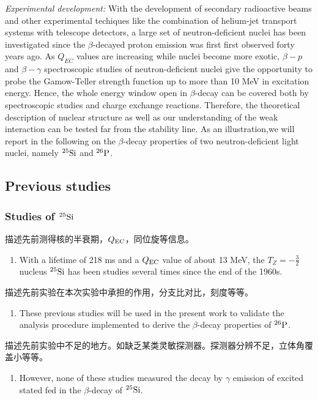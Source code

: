 \documentclass[a4paper]{article}
\begin{document}
\textit{Experimental development:} With the development of secondary radioactive beams and other experimental techiques like the combination of helium-jet transport systems with telescope detectors, a large set of neutron-deficient nuclei has been investigated since the $\beta$-decayed proton emission was first first observed forty years ago. As $Q_{EC}$ values are increasing while nuclei become more exotic, $\beta-p$ and $\beta-\gamma$ spectroscopic studies of neutron-deficient nuclei give the opportunity to probe the Gamow-Teller strength function up to more than 10 MeV in excitation energy. Hence, the whole energy window open in $\beta$-decay can be covered both by spectroscopic studies and charge exchange reactions. Therefore, the theoretical description of nuclear structure as well as our understanding of the weak interaction can be tested far from the stability line. As an illustration,we will report in the following on the $\beta$-decay properties of two neutron-deficient light nuclei, namely $^{25}\textnormal{Si}$ and $^{26}\textnormal{P}$.

\subsection{Previous studies}
\subsubsection{Studies of $^{25}\textnormal{Si}$}
描述先前测得核的半衰期，$Q_{\textnormal{EC}}$，同位旋等信息。
\begin{enumerate}
    \item With a lifetime of 218 ms and a $Q_{\textnormal{EC}}$ value of about 13 MeV, the $T_{Z}=-\frac{3}{2}$ nucleus $^{25}\textnormal{Si}$ has been studies several times since the end of the 1960s. 
\end{enumerate}

描述先前实验在本次实验中承担的作用，分支比对比，刻度等等。
\begin{enumerate}
    \item These previous studies will be used in the present work to validate the analysis procedure implemented to derive the $\beta$-decay properties of $^{26}\textnormal{P}$. 
\end{enumerate}

描述先前实验中不足的地方。如缺乏某类灵敏探测器。探测器分辨不足，立体角覆盖小等等。
\begin{enumerate}
    \item However, none of these studies measured the decay by $\gamma$ emission of excited stated fed in the $\beta$-decay of $^{25}\textnormal{Si}$.
\end{enumerate}
\end{document}
